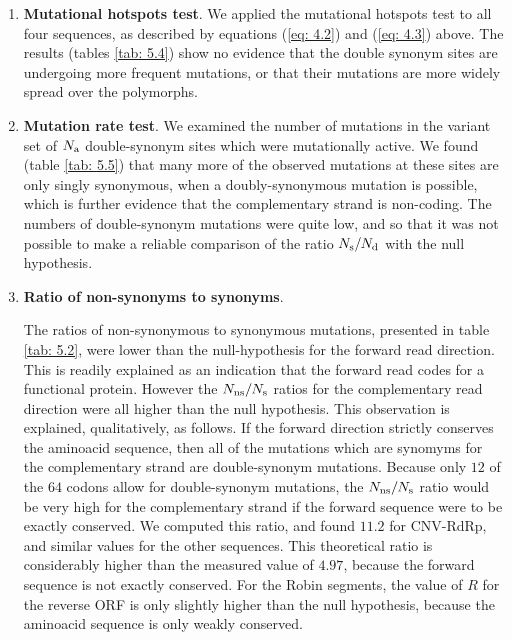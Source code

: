 \documentclass[unnumsec,webpdf,contemporary,large,namedate]{oup-authoring-template}%
\theoremstyle{thmstyleone}%
\theoremstyle{thmstyletwo}%
\theoremstyle{thmstylethree}%
\begin{document}
\begin{enumerate}

\item{\bf Mutational hotspots test}. We applied the mutational hotspots test to all four sequences, 
as described by equations (\ref{eq: 4.2}) and (\ref{eq: 4.3}) above. 
The results (tables \ref{tab: 5.4}) show no evidence that the double synonym sites are 
undergoing more frequent mutations, or that their mutations are more widely spread over the polymorphs. 

\item{\bf Mutation rate test}. We examined the number of mutations in the variant set 
of $N_{\rm a}$ double-synonym sites which were mutationally active. We found (table \ref{tab: 5.5})
that many more of the observed mutations at these sites are only singly synonymous, when
a doubly-synonymous mutation is possible, which is further evidence that the complementary 
strand is non-coding. The numbers of double-synonym mutations 
were quite low, and so that it was not possible to make a reliable comparison of the 
ratio $N_{\rm s}/N_{\rm d}$ with the null hypothesis.

\item{\bf Ratio of non-synonyms to synonyms}.

The ratios of non-synonymous to synonymous mutations, presented in table \ref{tab: 5.2}, were
lower than the null-hypothesis for the forward read direction. This is readily explained as an indication 
that the forward read codes for a functional protein. However the $N_{\rm ns}/N_{\rm s}$ 
ratios for the complementary read direction were all higher than the null hypothesis. This observation 
is explained, qualitatively, as follows.
If the forward direction strictly conserves the aminoacid sequence, then all of the mutations 
which are synomyms for the complementary strand are double-synonym mutations. Because only 
$12$ of the $64$ codons allow for double-synonym mutations, the $N_{\rm ns}/N_{\rm s}$ 
ratio would be very high for the complementary strand if the forward sequence were to be exactly conserved.
We computed this ratio, and found $11.2$ for CNV-RdRp, and similar values for the other sequences. 
This theoretical ratio is considerably higher than the measured value of $4.97$, because the 
forward sequence is not exactly conserved. For the Robin segments, the value of $R$ for the reverse
ORF is only slightly higher than the null hypothesis, because the aminoacid sequence is only weakly 
conserved.

\end{enumerate}
\end{document}
